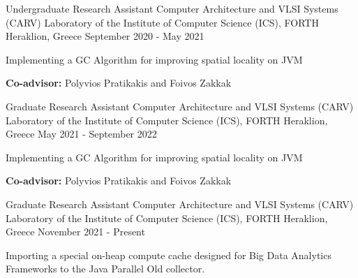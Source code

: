 

\begin{cventries}


  \cventry
    {Undergraduate Research Assistant} %
    {Computer Architecture and VLSI Systems (CARV) Laboratory of the Institute of Computer Science (ICS), FORTH} %
    {Heraklion, Greece} %
    {September 2020 - May 2021} %
    {
      \begin{cvitems} %
        \item {Implementing a GC Algorithm for improving spatial locality on JVM}
        \item{\textbf{Co-advisor:} Polyvios Pratikakis and Foivos Zakkak}
      \end{cvitems}
    }
  \cventry
    {Graduate Research Assistant} %
    {Computer Architecture and VLSI Systems (CARV) Laboratory of the Institute of Computer Science (ICS), FORTH} %
    {Heraklion, Greece} %
    {May 2021 - September 2022} %
    {
      \begin{cvitems} %
        \item {Implementing a GC Algorithm for improving spatial locality on JVM}
        \item{\textbf{Co-advisor:} Polyvios Pratikakis and Foivos Zakkak}
      \end{cvitems}
    }
  \cventry
    {Graduate Research Assistant} %
    {Computer Architecture and VLSI Systems (CARV) Laboratory of the Institute of Computer Science (ICS), FORTH} %
    {Heraklion, Greece} %
    {November 2021 - Present} %
    {
      \begin{cvitems} %
        \item {Importing a special on-heap compute cache designed for Big Data Analytics Frameworks to the Java Parallel Old collector.}

\end{cvitems}}
\end{cventries}
